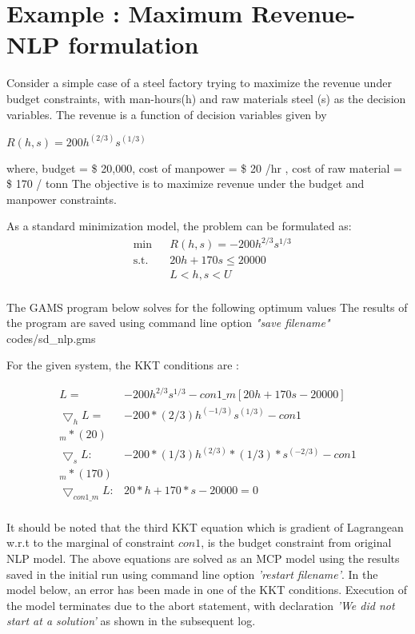 \documentclass{article}
\begin{document}
\section{Example : Maximum Revenue- NLP formulation}

Consider a simple case of a steel factory trying to maximize the revenue under budget constraints, with man-hours(h) and
raw materials steel (s) as the decision variables. The revenue is a function of decision variables given by

\centerline{$R(h,s) = 200 h^{(2/3)}s^{(1/3)} $ }
\bigbreak
\noindent where, budget = \$ 20,000, cost of manpower = \$ 20 /hr , cost of raw material = \$ 170 / tonn
The objective is to maximize revenue under the budget and manpower constraints.

\noindent As a standard minimization model, the problem can be formulated as:
\begin{equation}
\begin{aligned}
&	\min
& & R(h,s) = - 200 h^{2/3}s^{1/3}  \\
& \text{s.t.} & & 	 20h + 170s \leq 20000 \\
& & &			L< h,s < U   \\
\end{aligned}
\end{equation}

The GAMS program below solves for the following optimum values  
The results of the program are saved using command line option \textit{"save filename"}
 {codes/sd_nlp.gms}

\noindent For the given system, the KKT conditions are :

\begin{equation}
\begin{aligned}
 L = & - 200 h^{2/3}s^{1/3} - con1\_m [ 20h + 170 s - 20000]	\\
 \bigtriangledown _h L = & - 200* (2/3) h^{(-1/3)}  s^{(1/3)} - con1\\_m*(20)  	\\
 \bigtriangledown _s L:  & - 200 * (1 / 3) h^{(2/3)} *(1/3) *  s^{(-2/3)} - con1\\_m*(170)   \\
 \bigtriangledown _{con1\_m} L : &   20*h + 170 * s - 20000 =0 \\
\end{aligned}
\end{equation}

\noindent It should be noted that the third KKT equation which is gradient of Lagrangean w.r.t to the marginal of constraint $con1$, is the budget
constraint from original NLP model. The above equations are solved as an MCP model using the results saved in the initial run using command line
option \textit{'restart filename'}.
In the model below, an error has been made in one of the KKT conditions. Execution of the model terminates due to the abort statement,
with declaration \textit{'We did not start at a solution'} as shown in the subsequent log.
\end{document}
